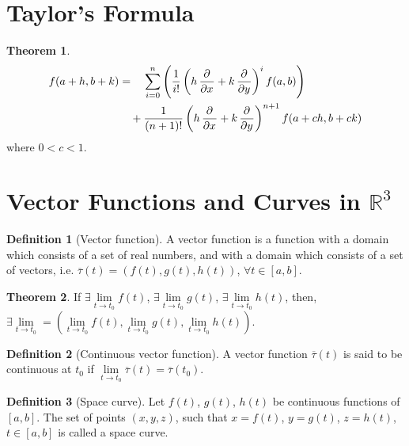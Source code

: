 \documentclass[fleqn, a4paper, 8pt, twoside]{amsart}
\theoremstyle{definition}
\theoremstyle{bluedefinition}
\newtheorem{definition}{Definition}
\theoremstyle{redtheorem}
\newtheorem{theorem}{Theorem}
\begin{document}
\begin{multicols}{2}
\begin{spacing}{0.7}
\section{Taylor's Formula}

\begin{theorem}
	\begin{align*}
		f(a + h, b + k) & = \quad \sum\limits_{i = 0}^{n} \left( \frac{1}{i!} \left( h \dpd{}{x} + k \dpd{}{y} \right)^i f(a,b) \right) \\
                                & \quad+ \frac{1}{(n + 1)!} \left( h \dpd{}{x} + k \dpd{}{y} \right)^{n + 1} f(a + c h, b + c k)
	\end{align*}
	where $0 < c < 1$.
	\label{Taylor's_Formula_for_2_variables}
\end{theorem}

\section{Vector Functions and Curves in $\mathbb{R}^3$}

\begin{definition}[Vector function]
	A vector function is a function with a domain which consists of a set of real numbers, and with a domain which consists of a set of vectors, i.e. $\overline{\tau}(t) = \left( f(t), g(t), h(t) \right)$, $\forall t \in [a,b]$.
\end{definition}

\begin{theorem}
	If $\exists \lim\limits_{t \to t_0} f(t)$, $\exists \lim\limits_{t \to t_0} g(t)$, $\exists \lim\limits_{t \to t_0} h(t)$, then, $\exists \lim\limits_{t \to t_0} = \left( \lim\limits_{t \to t_0} f(t), \lim\limits_{t \to t_0} g(t), \lim\limits_{t \to t_0} h(t) \right)$.
\end{theorem}

\begin{definition}[Continuous vector function]
	A vector function $\overline{\tau}(t)$ is said to be continuous at $t_0$ if $\lim\limits_{t \to t_0} \overline{\tau}(t) = \overline{\tau}(t_0)$.
\end{definition}

\begin{definition}[Space curve]
	Let $f(t)$, $g(t)$, $h(t)$ be continuous functions of $[a,b]$.
	The set of points $(x,y,z)$, such that $x = f(t)$, $y = g(t)$, $z = h(t)$, $t \in [a,b]$ is called a space curve.
\end{definition}


\end{spacing}
\end{multicols}
\end{document}
